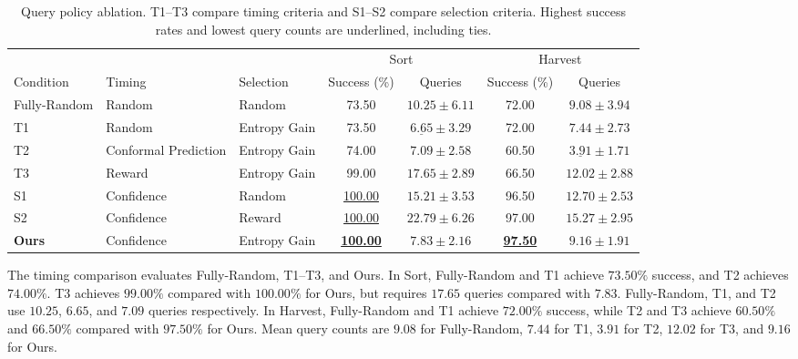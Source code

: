 \begin{table}[t]
\centering
\caption{Query policy ablation. T1--T3 compare timing criteria and S1--S2 compare selection criteria. Highest success rates and lowest query counts are underlined, including ties.}
\label{tab:policy_ablation}
\label{tab:when_what_random}
\small
\setlength{\tabcolsep}{4pt}
\begin{tabular}{lllcccc}
\toprule
 & & & \multicolumn{2}{c}{Sort} & \multicolumn{2}{c}{Harvest} \\
\cmidrule(lr){4-5}\cmidrule(lr){6-7}
Condition & Timing & Selection & Success (\%) & Queries & Success (\%) & Queries \\
\midrule
Fully-Random & Random & Random & 73.50 & $10.25 \pm 6.11$ & 72.00 & $9.08 \pm 3.94$ \\
T1 & Random & Entropy Gain & 73.50 & $\underline{6.65} \pm 3.29$ & 72.00 & $7.44 \pm 2.73$ \\
T2 & Conformal Prediction & Entropy Gain & 74.00 & $7.09 \pm 2.58$ & 60.50 & $\underline{3.91} \pm 1.71$ \\
T3 & Reward & Entropy Gain & 99.00 & $17.65 \pm 2.89$ & 66.50 & $12.02 \pm 2.88$ \\
S1 & Confidence & Random & \underline{100.00} & $15.21 \pm 3.53$ & 96.50 & $12.70 \pm 2.53$ \\
S2 & Confidence & Reward & \underline{100.00} & $22.79 \pm 6.26$ & 97.00 & $15.27 \pm 2.95$ \\
\textbf{Ours} & Confidence & Entropy Gain & \textbf{\underline{100.00}} & $\boldsymbol{7.83 \pm 2.16}$ & \textbf{\underline{97.50}} & $\boldsymbol{9.16 \pm 1.91}$ \\
\bottomrule
\end{tabular}
\end{table}

The timing comparison evaluates Fully-Random, T1--T3, and Ours. In Sort, Fully-Random and T1 achieve $73.50\%$ success, and T2 achieves $74.00\%$. T3 achieves $99.00\%$ compared with $100.00\%$ for Ours, but requires $17.65$ queries compared with $7.83$. Fully-Random, T1, and T2 use $10.25$, $6.65$, and $7.09$ queries respectively. In Harvest, Fully-Random and T1 achieve $72.00\%$ success, while T2 and T3 achieve $60.50\%$ and $66.50\%$ compared with $97.50\%$ for Ours. Mean query counts are $9.08$ for Fully-Random, $7.44$ for T1, $3.91$ for T2, $12.02$ for T3, and $9.16$ for Ours.

